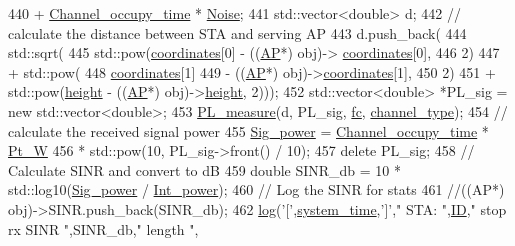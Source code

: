 \begin{DoxyCode}
440                 + \hyperlink{classSTA_a409c7dfb7f0dd3688fdf655a36cdb9bc}{Channel\_occupy\_time} * \hyperlink{classSTA_ae9a319d9b58f28610defc9e0fc51aa60}{Noise};
441         std::vector<double> d;
442         \textcolor{comment}{// calculate the distance between STA and serving AP}
443         d.push\_back(
444                 std::sqrt(
445                         std::pow(\hyperlink{classSTA_aba57e1e65b70a3b6f556495e47f6838a}{coordinates}[0] - ((\hyperlink{classAP}{AP}*) obj)->
      \hyperlink{classSTA_aba57e1e65b70a3b6f556495e47f6838a}{coordinates}[0],
446                                 2)
447                                 + std::pow(
448                                         \hyperlink{classSTA_aba57e1e65b70a3b6f556495e47f6838a}{coordinates}[1]
449                                                 - ((\hyperlink{classAP}{AP}*) obj)->\hyperlink{classSTA_aba57e1e65b70a3b6f556495e47f6838a}{coordinates}[1],
450                                         2)
451                                 + std::pow(\hyperlink{classSTA_a85ba9b72f68ceeef8c89f02806c71890}{height} - ((\hyperlink{classAP}{AP}*) obj)->\hyperlink{classSTA_a85ba9b72f68ceeef8c89f02806c71890}{height}, 2)));
452         std::vector<double> *PL\_sig = \textcolor{keyword}{new} std::vector<double>;
453         \hyperlink{PL__measure_8cpp_afb433c5f099becf495d3c9d29ffc707d}{PL\_measure}(d, PL\_sig, \hyperlink{classSTA_a07c54eac4b0f34790e0a2e4dcbe720ac}{fc}, \hyperlink{classSTA_a5d1a873bdd6733103441abadf4db1475}{channel\_type});
454         \textcolor{comment}{// calculate the received signal power}
455         \hyperlink{classSTA_aed9adbb07ca59c2efa1470e76180331c}{Sig\_power} = \hyperlink{classSTA_a409c7dfb7f0dd3688fdf655a36cdb9bc}{Channel\_occupy\_time} * \hyperlink{classSTA_a8ec6260021c741ccc08a6ec25793c1f3}{Pt\_W}
456                 * std::pow(10, PL\_sig->front() / 10);
457         \textcolor{keyword}{delete} PL\_sig;
458         \textcolor{comment}{// Calculate SINR and convert to dB}
459         \textcolor{keywordtype}{double} SINR\_db = 10 * std::log10(\hyperlink{classSTA_aed9adbb07ca59c2efa1470e76180331c}{Sig\_power} / \hyperlink{classSTA_aa1e60f7391861b468314437fbad67280}{Int\_power});
460         \textcolor{comment}{// Log the SINR for stats}
461         \textcolor{comment}{//((AP*) obj)->SINR.push\_back(SINR\_db);}
462         \hyperlink{STA_8cpp_aa5af53510557e77a03906c5016ebe66f}{log}(\textcolor{charliteral}{'['},\hyperlink{STA_8cpp_aaa03a568dc1d9d3391286ea24b9cfb63}{system\_time},\textcolor{charliteral}{']'},\textcolor{stringliteral}{" STA: "},\hyperlink{classSTA_a9376abb50969b5b16aeb5fb0e449e6f7}{ID},\textcolor{stringliteral}{" stop rx SINR "},SINR\_db,\textcolor{stringliteral}{" length "},

\end{DoxyCode}
